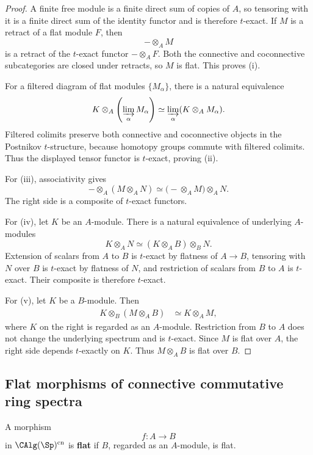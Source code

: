 \begin{proof}
A finite free module is a finite direct sum of copies of $A$, so tensoring
with it is a finite direct sum of the identity functor and is therefore
$t$-exact. If $M$ is a retract of a flat module $F$, then
\[
    -\otimes_A M
\]
is a retract of the $t$-exact functor $-\otimes_A F$. Both the connective
and coconnective subcategories are closed under retracts, so $M$ is flat.
This proves (i).

For a filtered diagram of flat modules $\{M_\alpha\}$, there is a natural
equivalence
\[
    K\otimes_A
    \left(
        \varinjlim_\alpha M_\alpha
    \right)
    \simeq
    \varinjlim_\alpha
    (K\otimes_A M_\alpha).
\]
Filtered colimits preserve both connective and coconnective objects in
the Postnikov $t$-structure, because homotopy groups commute with filtered
colimits. Thus the displayed tensor functor is $t$-exact, proving (ii).

For (iii), associativity gives
\[
    -\otimes_A(M\otimes_A N)
    \simeq
    \bigl(
        -\otimes_A M
    \bigr)
    \otimes_A N.
\]
The right side is a composite of $t$-exact functors.

For (iv), let $K$ be an $A$-module. There is a natural equivalence of
underlying $A$-modules
\[
    K\otimes_A N
    \simeq
    (K\otimes_A B)\otimes_B N.
\]
Extension of scalars from $A$ to $B$ is $t$-exact by flatness of
$A\to B$, tensoring with $N$ over $B$ is $t$-exact by flatness of $N$,
and restriction of scalars from $B$ to $A$ is $t$-exact. Their composite
is therefore $t$-exact.

For (v), let $K$ be a $B$-module. Then
\[
\begin{aligned}
    K\otimes_B(M\otimes_A B)
    &\simeq
    K\otimes_A M,
\end{aligned}
\]
where $K$ on the right is regarded as an $A$-module. Restriction from
$B$ to $A$ does not change the underlying spectrum and is $t$-exact.
Since $M$ is flat over $A$, the right side depends $t$-exactly on $K$.
Thus $M\otimes_A B$ is flat over $B$.
\end{proof}

\subsection{Flat morphisms of connective commutative ring spectra}

\begin{definition}
\label{def:flat-spectral-algebra-morphism}
A morphism
\[
    f
    \colon
    A
    \longrightarrow
    B
\]
in $\CAlg(\Sp)^{\mathrm{cn}}$ is \textbf{flat} if $B$, regarded as an
$A$-module, is flat.
\end{definition}

